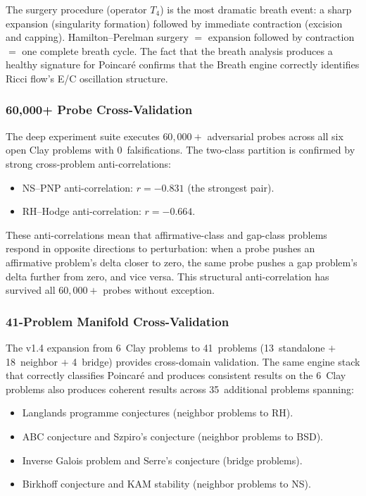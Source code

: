 \documentclass[11pt]{article}
\begin{document}
\noindent
The surgery procedure (operator $T_4$) is the most dramatic breath event:
a sharp expansion (singularity formation) followed by immediate contraction
(excision and capping).  Hamilton--Perelman surgery $=$ expansion followed
by contraction $=$ one complete breath cycle.  The fact that the breath
analysis produces a healthy signature for Poincar\'e confirms that the
Breath engine correctly identifies Ricci flow's E/C oscillation structure.

\subsubsection{60,000+ Probe Cross-Validation}

The deep experiment suite executes $60{,}000{+}$ adversarial probes across
all six open Clay problems with 0~falsifications.  The two-class partition
is confirmed by strong cross-problem anti-correlations:
\begin{itemize}
\item NS--PNP anti-correlation: $r = -0.831$ (the strongest pair).
\item RH--Hodge anti-correlation: $r = -0.664$.
\end{itemize}

\noindent
These anti-correlations mean that affirmative-class and gap-class problems
respond in opposite directions to perturbation: when a probe pushes an
affirmative problem's delta closer to zero, the same probe pushes a
gap problem's delta further from zero, and vice versa.  This structural
anti-correlation has survived all $60{,}000{+}$ probes without exception.

\subsubsection{41-Problem Manifold Cross-Validation}

The v1.4 expansion from 6~Clay problems to 41~problems
(13~standalone $+$ 18~neighbor $+$ 4~bridge) provides cross-domain
validation.  The same engine stack that correctly classifies Poincar\'e
and produces consistent results on the 6~Clay problems also produces
coherent results across 35~additional problems spanning:
\begin{itemize}
\item Langlands programme conjectures (neighbor problems to RH).
\item ABC conjecture and Szpiro's conjecture (neighbor problems to BSD).
\item Inverse Galois problem and Serre's conjecture (bridge problems).
\item Birkhoff conjecture and KAM stability (neighbor problems to NS).
\end{itemize}
\end{document}
